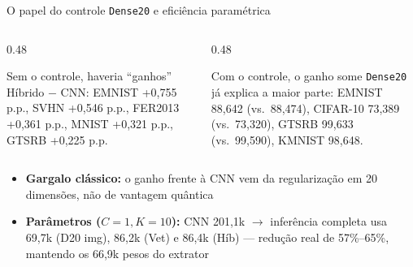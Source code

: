 \documentclass[aspectratio=169,11pt,brazil]{beamer}
\begin{document}
\begin{frame}{O papel do controle \texttt{Dense20} e eficiência paramétrica}
  \begin{columns}[T,onlytextwidth]
    \begin{column}{0.48\textwidth}
      \begin{alertblock}{Sem o controle, haveria ``ganhos''}
        Híbrido $-$ CNN: EMNIST +0,755 p.p., SVHN +0,546 p.p., FER2013 +0,361 p.p., MNIST +0,321 p.p., GTSRB +0,225 p.p.
      \end{alertblock}
    \end{column}
    \begin{column}{0.48\textwidth}
      \begin{block}{Com o controle, o ganho some}
        \texttt{Dense20} já explica a maior parte: EMNIST 88,642 (vs.\ 88,474), CIFAR-10 73,389 (vs.\ 73,320), GTSRB 99,633 (vs.\ 99,590), KMNIST 98,648.
      \end{block}
    \end{column}
  \end{columns}
  \vspace{0.25cm}
  \begin{itemize}\footnotesize\setlength{\itemsep}{6pt}
    \item \textbf{Gargalo clássico:} o ganho frente à CNN vem da regularização em 20 dimensões, não de vantagem quântica
    \item \textbf{Parâmetros ($C=1, K=10$):} CNN 201,1k $\to$ inferência completa usa 69,7k (D20 img), 86,2k (Vet) e 86,4k (Híb) --- redução real de 57\%--65\%, mantendo os 66,9k pesos do extrator
  \end{itemize}
\end{frame}
\end{document}

